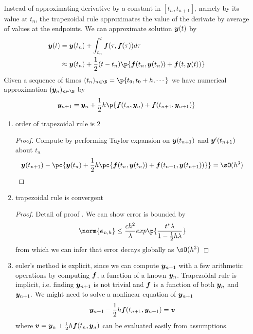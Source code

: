 \documentclass[11pt]{article}
\begin{document}
\begin{definition*}
     Instead of approximating derivative by a constant in $[t_n, t_{n+1}]$, namely by its value at $t_n$, the trapezoidal rule approximates the value of the derivate by average of values at the endpoints. We can approximate solution $\by(t)$ by 
    \begin{align*}
        \by(t) 
        &= \by(t_n) + \int_{t_n}^t \bf(\tau, \bf(\tau)) d\tau \\
        &\approx \by(t_n) + \frac{1}{2} (t-t_n) \p{\bf(t_n, \by(t_n)) + \bf(t, \by(t))}
    \end{align*}
    Given a sequence of times $(t_n)_{n\in\N} = \p{t_0, t_0+h,\cdots}$ we have numerical approximation $(\by_n)_{n\in\N}$ by 
    \[
        \by_{n+1} = \by_n + \frac{1}{2} h \p{
            \bf(t_n, \by_n) + \bf(t_{n+1}, \by_{n+1})
        }
    \]
    \begin{enumerate}
        \item {} order of trapezoidal rule is 2
        \begin{proof}
            Compute by performing Taylor expansion on $\by(t_{n+1})$ and $\by'(t_{n+1})$ about $t_n$
            \[
                \by(t_{n+1}) - \pc{
                    \by(t_n) + \frac{1}{2}h \pc{
                        \bf(t_n, \by(t_n)) + \bf(t_{n+1}, \by(t_{n+1}))
                    }
                } = \sO(h^3)
            \]
        \end{proof}
        \item {} trapezoidal rule is convergent
        \begin{proof}
            Detail of proof . We can show error is bounded by 
            \[
                \norm{\be_{n,h}}\leq \frac{ch^2}{\lambda} exp \p{
                    \frac{t^* \lambda}{1 - \frac{1}{2}h\lambda}
                }
            \]
            from which we can infer that error decays globally as $\sO(h^2)$
        \end{proof}
        \item {} euler's method is explicit, since we can compute $\by_{n+1}$ with a few arithmetic operations by computing $\bf$, a function of a known $\by_n$. Trapezoidal rule is implicit, i.e. finding $\by_{n+1}$ is not trivial and $\bf$ is a function of both $\by_n$ and $\by_{n+1}$. We might need to solve a nonlinear equation of $\by_{n+1}$
        \[
            \by_{n+1} - \frac{1}{2}h \bf(t_{n+1}, \by_{n+1}) = \bv
        \]
        where $\bv = \by_n + \textstyle \frac{1}{2} h \bf(t_n, \by_n)$ can be evaluated easily from assumptions.
    \end{enumerate}
\end{definition*}
\end{document}
